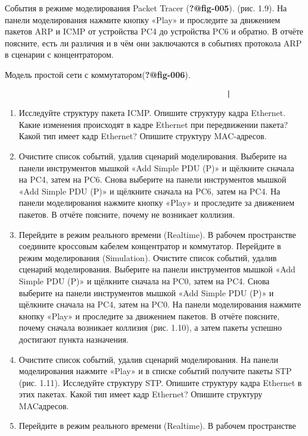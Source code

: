 \documentclass[
  english,
  russian,
  12pt,
  a4paper,
  DIV=11,
  numbers=noendperiod]{scrreprt}
\begin{document}
События в режиме моделирования Packet Tracer (\textbf{?@fig-005}). (рис.
1.9). На панели моделирования нажмите кнопку «Play» и проследите за
движением пакетов ARP и ICMP от устройства PC4 до устройства PC6 и
обратно. В отчёте поясните, есть ли различия и в чём они заключаются в
событиях протокола ARP в сценарии с концентратором.

Модель простой сети с коммутатором(\textbf{?@fig-006}).

\begin{verbatim}
                                                    |
\end{verbatim}

\begin{enumerate}
\def\labelenumi{\arabic{enumi}.}
\setcounter{enumi}{8}
\item
  Исследуйте структуру пакета ICMP. Опишите структуру кадра Ethernet.
  Какие изменения происходят в кадре Ethernet при передвижении пакета?
  Какой тип имеет кадр Ethernet? Опишите структуру MAC-адресов.
\item
  Очистите список событий, удалив сценарий моделирования. Выберите на
  панели инструментов мышкой «Add Simple PDU (P)» и щёлкните сначала на
  PC4, затем на PC6. Снова выберите на панели инструментов мышкой «Add
  Simple PDU (P)» и щёлкните сначала на PC6, затем на PC4. На панели
  моделирования нажмите кнопку «Play» и проследите за движением пакетов.
  В отчёте поясните, почему не возникает коллизия.
\item
  Перейдите в режим реального времени (Realtime). В рабочем пространстве
  соедините кроссовым кабелем концентратор и коммутатор. Перейдите в
  режим моделирования (Simulation). Очистите список событий, удалив
  сценарий моделирования. Выберите на панели инструментов мышкой «Add
  Simple PDU (P)» и щёлкните сначала на PC0, затем на PC4. Снова
  выберите на панели инструментов мышкой «Add Simple PDU (P)» и щёлкните
  сначала на PC4, затем на PC0. На панели моделирования нажмите кнопку
  «Play» и проследите за движением пакетов. В отчёте поясните, почему
  сначала возникает коллизия (рис. 1.10), а затем пакеты успешно
  достигают пункта назначения.
\item
  Очистите список событий, удалив сценарий моделирования. На панели
  моделирования нажмите «Play» и в списке событий получите пакеты STP
  (рис. 1.11). Исследуйте структуру STP. Опишите структуру кадра
  Ethernet в этих пакетах. Какой тип имеет кадр Ethernet? Опишите
  структуру MACадресов.
\item
  Перейдите в режим реального времени (Realtime). В рабочем пространстве

\end{enumerate}
\end{document}

